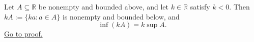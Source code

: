 \begin{theorem}
\label{thm:negative-scalar-mult-infimum}
Let $A\subseteq\mathbb{R}$ be nonempty and bounded above, and let
$k\in\mathbb{R}$ satisfy $k<0$.  Then $kA:=\{ka:a\in A\}$ is nonempty and
bounded below, and
\[
  \inf(kA)=k\sup A.
\]
\hyperref[prf:negative-scalar-mult-infimum]{Go to proof.}
\end{theorem}